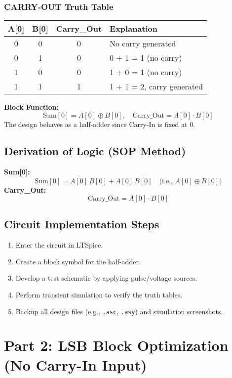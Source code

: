 \documentclass[12pt]{article}
\begin{document}
\subsubsection*{CARRY-OUT Truth Table}
\begin{center}
\begin{tabular}{|c|c|c|l|}
\hline
\textbf{A[0]} & \textbf{B[0]} & \textbf{Carry\_Out} & \textbf{Explanation} \\ \hline
0 & 0 & 0 & No carry generated \\ \hline
0 & 1 & 0 & 0 + 1 = 1 (no carry) \\ \hline
1 & 0 & 0 & 1 + 0 = 1 (no carry) \\ \hline
1 & 1 & 1 & 1 + 1 = 2, carry generated \\ \hline
\end{tabular}
\end{center}

\noindent \textbf{Block Function:}  
\[
\text{Sum}[0] = A[0] \oplus B[0], \quad \text{Carry\_Out} = A[0] \cdot B[0]
\]
The design behaves as a half-adder since Carry-In is fixed at 0.

\subsection{Derivation of Logic (SOP Method)}
\noindent \textbf{Sum[0]:}
\[
\text{Sum}[0] = \overline{A[0]}\,B[0] + A[0]\,\overline{B[0]} \quad \text{(i.e., } A[0] \oplus B[0] \text{)}
\]
\noindent \textbf{Carry\_Out:}
\[
\text{Carry\_Out} = A[0] \cdot B[0]
\]

\subsection{Circuit Implementation Steps}
\begin{enumerate}
    \item Enter the circuit in LTSpice.
    \item Create a block symbol for the half-adder.
    \item Develop a test schematic by applying pulse/voltage sources.
    \item Perform transient simulation to verify the truth tables.
    \item Backup all design files (e.g., \texttt{.asc}, \texttt{.asy}) and simulation screenshots.
\end{enumerate}

\section{Part 2: LSB Block Optimization (No Carry-In Input)}
\end{document}
